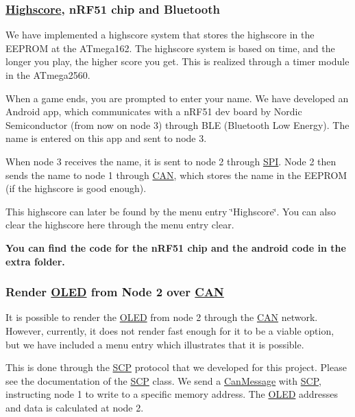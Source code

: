 \subsubsection*{\hyperlink{namespace_highscore}{Highscore}, n\+R\+F51 chip and Bluetooth}

We have implemented a highscore system that stores the highscore in the E\+E\+P\+R\+OM at the A\+Tmega162. The highscore system is based on time, and the longer you play, the higher score you get. This is realized through a timer module in the A\+Tmega2560.

When a game ends, you are prompted to enter your name. We have developed an Android app, which communicates with a n\+R\+F51 dev board by Nordic Semiconductor (from now on node 3) through B\+LE (Bluetooth Low Energy). The name is entered on this app and sent to node 3.

When node 3 receives the name, it is sent to node 2 through \hyperlink{namespace_s_p_i}{S\+PI}. Node 2 then sends the name to node 1 through \hyperlink{class_c_a_n}{C\+AN}, which stores the name in the E\+E\+P\+R\+OM (if the highscore is good enough).

This highscore can later be found by the menu entry \char`\"{}\+Highscore\char`\"{}. You can also clear the highscore here through the menu entry clear.

{\bfseries You can find the code for the n\+R\+F51 chip and the android code in the extra folder.}

\subsubsection*{Render \hyperlink{class_o_l_e_d}{O\+L\+ED} from Node 2 over \hyperlink{class_c_a_n}{C\+AN}}

It is possible to render the \hyperlink{class_o_l_e_d}{O\+L\+ED} from node 2 through the \hyperlink{class_c_a_n}{C\+AN} network. However, currently, it does not render fast enough for it to be a viable option, but we have included a menu entry which illustrates that it is possible.

This is done through the \hyperlink{class_s_c_p}{S\+CP} protocol that we developed for this project. Please see the documentation of the \hyperlink{class_s_c_p}{S\+CP} class. We send a \hyperlink{struct_can_message}{Can\+Message} with \hyperlink{class_s_c_p}{S\+CP}, instructing node 1 to write to a specific memory address. The \hyperlink{class_o_l_e_d}{O\+L\+ED} addresses and data is calculated at node 2. 